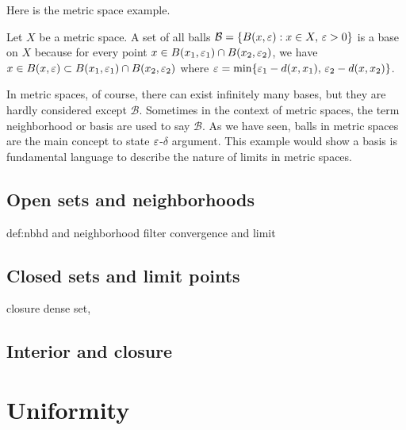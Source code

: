 Here is the metric space example.
\begin{ex}
Let $X$ be a metric space.
A set of all balls $\mathcal{B}=\{B(x,\varepsilon):x\in X,\,\varepsilon>0\}$ is a base on $X$ because for every point $x\in B(x_1,\varepsilon_1)\cap B(x_2,\varepsilon_2)$, we have $x\in B(x,\varepsilon)\subset B(x_1,\varepsilon_1)\cap B(x_2,\varepsilon_2)$ where $\varepsilon=\min\{\varepsilon_1-d(x,x_1),\,\varepsilon_2-d(x,x_2)\}$.
\end{ex}

In metric spaces, of course, there can exist infinitely many bases, but they are hardly considered except $\mathcal{B}$.
Sometimes in the context of metric spaces, the term neighborhood or basis are used to say $\mathcal{B}$.
As we have seen, balls in metric spaces are the main concept to state $\varepsilon$-$\delta$ argument.
This example would show a basis is fundamental language to describe the nature of limits in metric spaces.










\subsection{Open sets and neighborhoods}
def:nbhd and neighborhood filter
convergence and limit

\subsection{Closed sets and limit points}
 closure
 dense set,
\subsection{Interior and closure}




























\section{Uniformity}

